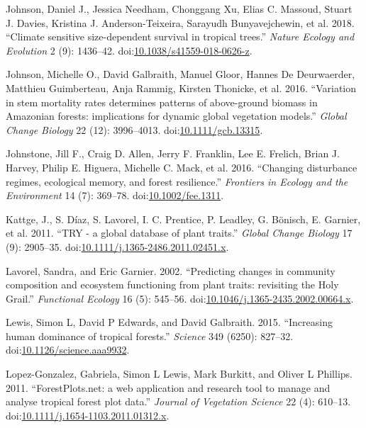 \documentclass[]{elsarticle} %
\begin{document}
\hypertarget{ref-Johnson2018}{}
Johnson, Daniel J., Jessica Needham, Chonggang Xu, Elias C. Massoud,
Stuart J. Davies, Kristina J. Anderson-Teixeira, Sarayudh
Bunyavejchewin, et al. 2018. ``Climate sensitive size-dependent survival
in tropical trees.'' \emph{Nature Ecology and Evolution} 2 (9):
1436--42.
doi:\href{https://doi.org/10.1038/s41559-018-0626-z}{10.1038/s41559-018-0626-z}.

\hypertarget{ref-Johnson2016}{}
Johnson, Michelle O., David Galbraith, Manuel Gloor, Hannes De
Deurwaerder, Matthieu Guimberteau, Anja Rammig, Kirsten Thonicke, et al.
2016. ``Variation in stem mortality rates determines patterns of
above-ground biomass in Amazonian forests: implications for dynamic
global vegetation models.'' \emph{Global Change Biology} 22 (12):
3996--4013.
doi:\href{https://doi.org/10.1111/gcb.13315}{10.1111/gcb.13315}.

\hypertarget{ref-Johnstone2016}{}
Johnstone, Jill F., Craig D. Allen, Jerry F. Franklin, Lee E. Frelich,
Brian J. Harvey, Philip E. Higuera, Michelle C. Mack, et al. 2016.
``Changing disturbance regimes, ecological memory, and forest
resilience.'' \emph{Frontiers in Ecology and the Environment} 14 (7):
369--78. doi:\href{https://doi.org/10.1002/fee.1311}{10.1002/fee.1311}.

\hypertarget{ref-Kattge2011}{}
Kattge, J., S. Díaz, S. Lavorel, I. C. Prentice, P. Leadley, G. Bönisch,
E. Garnier, et al. 2011. ``TRY - a global database of plant traits.''
\emph{Global Change Biology} 17 (9): 2905--35.
doi:\href{https://doi.org/10.1111/j.1365-2486.2011.02451.x}{10.1111/j.1365-2486.2011.02451.x}.

\hypertarget{ref-Lavorel2002}{}
Lavorel, Sandra, and Eric Garnier. 2002. ``Predicting changes in
community composition and ecosystem functioning from plant traits:
revisiting the Holy Grail.'' \emph{Functional Ecology} 16 (5): 545--56.
doi:\href{https://doi.org/10.1046/j.1365-2435.2002.00664.x}{10.1046/j.1365-2435.2002.00664.x}.

\hypertarget{ref-Lewis2015}{}
Lewis, Simon L, David P Edwards, and David Galbraith. 2015. ``Increasing
human dominance of tropical forests.'' \emph{Science} 349 (6250):
827--32.
doi:\href{https://doi.org/10.1126/science.aaa9932}{10.1126/science.aaa9932}.

\hypertarget{ref-Lopez-Gonzalez2011}{}
Lopez-Gonzalez, Gabriela, Simon L Lewis, Mark Burkitt, and Oliver L
Phillips. 2011. ``ForestPlots.net: a web application and research tool
to manage and analyse tropical forest plot data.'' \emph{Journal of
Vegetation Science} 22 (4): 610--13.
doi:\href{https://doi.org/10.1111/j.1654-1103.2011.01312.x}{10.1111/j.1654-1103.2011.01312.x}.
\end{document}
